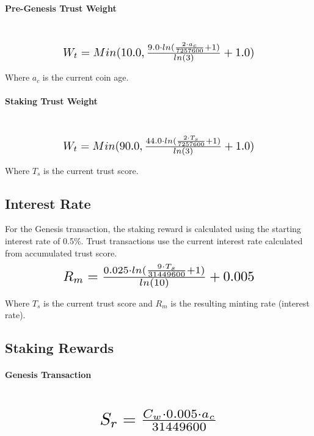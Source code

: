 \documentclass[11pt]{article}
\begin{document}
\paragraph{Pre-Genesis Trust Weight} ~\\
\begin{equation}
\resizebox{.65\hsize}{!}{$W_{t} = Min(10.0, \frac{9.0 \cdot ln(\frac{2 \cdot a_c}{7257600} + 1)}{ln(3)} + 1.0)$}
\end{equation}

\noindent Where $a_c$ is the current coin age.\\

\paragraph{Staking Trust Weight} ~\\
\begin{equation}
\resizebox{.65\hsize}{!}{$W_{t} = Min(90.0, \frac{44.0 \cdot ln(\frac{2 \cdot T_{s}}{7257600} + 1)}{ln(3)} + 1.0)$}
\end{equation}

\noindent Where $T_{s}$ is the current trust score.\\


\subsection{Interest Rate}
\noindent For the Genesis transaction, the staking reward is calculated using the starting interest rate of 0.5\%. Trust transactions use the current interest rate calculated from accumulated trust score.\\
 
\begin{equation}
\resizebox{.65\hsize}{!}{$R_{m} = \frac{0.025 \cdot ln(\frac{9 \cdot T_{s}}{31449600} + 1)}{ln(10)} + 0.005$}
\end{equation}

\noindent Where $T_{s}$ is the current trust score and $R_{m}$ is the resulting minting rate (interest rate).\\


\subsection{Staking Rewards}
\paragraph{Genesis Transaction} ~\\
\begin{equation}
\resizebox{.40\hsize}{!}{$S_{r} = \frac{C_{w} \cdot 0.005 \cdot a_c}{31449600}$}
\end{equation}
\end{document}
